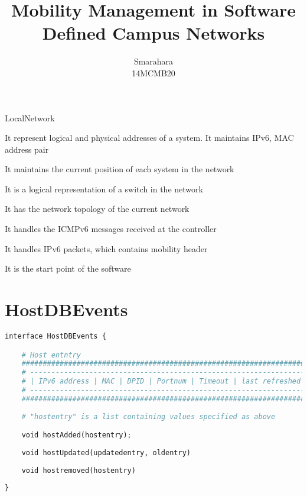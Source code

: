 \documentclass[10pt,a4paper,titlepage]{report}
\author{Smarahara \\ 14MCMB20}
\title{Mobility Management in Software Defined Campus Networks}
\begin{document}
	\maketitle
	\begin{labeling}{LocalNetwork}
		\item [Address] It represent logical and physical addresses of a system. It maintains IPv6, MAC address pair
		\item [HostDB] It maintains the current position of each system in the network
		\item [Switch] It is a logical representation of a switch in the network
		\item [LocalNetwork] It has the network topology of the current network
		\item [ICMPv6] It handles the ICMPv6 messages received at the controller
		\item [HomeAgent] It handles IPv6 packets, which contains mobility header
		\item [Init] It is the start point of the software
	\end{labeling}

	\renewcommand{\caption}{\textbf{def }}
	\renewcommand{\algorithmicforall}{\textbf{foreach }}

\section{HostDBEvents}
\begin{lstlisting}[language=Python]
interface HostDBEvents {

	# Host entntry
	######################################################################
	# ------------------------------------------------------------------ #
	# | IPv6 address | MAC | DPID | Portnum | Timeout | last refreshed | #
	# ------------------------------------------------------------------ #
	######################################################################
	
	# "hostentry" is a list containing values specified as above

	void hostAdded(hostentry);
	
	void hostUpdated(updatedentry, oldentry)
	
	void hostremoved(hostentry)
	
}
\end{lstlisting}
\end{document}
